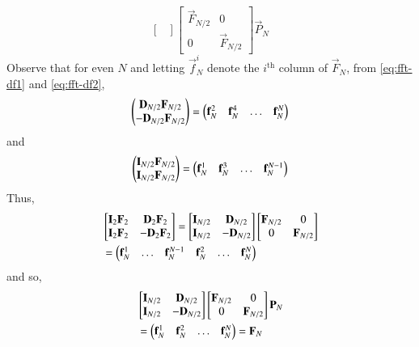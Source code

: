 \documentclass[journal,12pt,twocolumn]{IEEEtran}
\renewcommand\thesection{\arabic{section}}
\begin{document}
\begin{enumerate}[label=\arabic*.,ref=\thesection.\theenumi]
\begin{equation}
\begin{bmatrix}
\end{bmatrix}
\begin{bmatrix}
\vec{F}_{N/2} & 0 \\
0 & \vec{F}_{N/2}
\end{bmatrix}
\vec{P}_{N}
\end{equation}
\solution Observe that for even $N$ and letting $\vec{f}_N^i$ denote the $i^{\text{th}}$ column of $\vec{F}_N$, from \eqref{eq:fft-df1} and \eqref{eq:fft-df2},
\begin{align}
	\begin{pmatrix}\mathbf{D}_{N/2}\mathbf{F}_{N/2} \\ -\mathbf{D}_{N/2}\mathbf{F}_{N/2}\end{pmatrix} = \begin{pmatrix}\mathbf{f}_N^{2} & \mathbf{f}_N^{4} & \ldots & \mathbf{f}_N^{N}\end{pmatrix}
\end{align}
and
\begin{align}
	\begin{pmatrix}\mathbf{I}_{N/2}\mathbf{F}_{N/2} \\ \mathbf{I}_{N/2}\mathbf{F}_{N/2}\end{pmatrix} = \begin{pmatrix}\mathbf{f}_N^{1} & \mathbf{f}_N^{3} & \ldots & \mathbf{f}_N^{N - 1}\end{pmatrix}
\end{align}
Thus,
\begin{align}
	&\begin{bmatrix}\mathbf{I}_2\mathbf{F}_2 & \mathbf{D}_2\mathbf{F}_2 \\ \mathbf{I}_2\mathbf{F}_2 & -\mathbf{D}_2\mathbf{F}_2\end{bmatrix} = \begin{bmatrix}\mathbf{I}_{N/2} & \mathbf{D}_{N/2} \\ \mathbf{I}_{N/2} & -\mathbf{D}_{N/2}\end{bmatrix}\begin{bmatrix}\mathbf{F}_{N/2} & 0 \\ 0 & \mathbf{F}_{N/2}\end{bmatrix} \nonumber \\
	&= \begin{pmatrix}\mathbf{f}_N^{1} & \ldots & \mathbf{f}_N^{N - 1} & \mathbf{f}_N^{2} & \ldots & \mathbf{f}_N^{N}\end{pmatrix}
\end{align}
and so,
\begin{align}
	&\begin{bmatrix}\mathbf{I}_{N/2} & \mathbf{D}_{N/2} \\ \mathbf{I}_{N/2} & -\mathbf{D}_{N/2}\end{bmatrix}\begin{bmatrix}\mathbf{F}_{N/2} & 0 \\ 0 & \mathbf{F}_{N/2}\end{bmatrix}\mathbf{P}_{N} \nonumber \\
	&= \begin{pmatrix}\mathbf{f}_N^{1} & \mathbf{f}_N^{2} & \ldots & \mathbf{f}_N^{N}\end{pmatrix} = \mathbf{F}_N
\end{align}


\end{enumerate}
\end{document}
